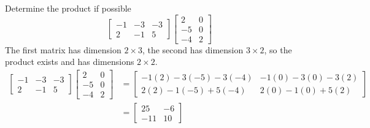 \documentclass[letterpaper,12pt]{article}
\begin{document}
\begin{example}
Determine the product if possible
\begin{equation*}
    \begin{bmatrix} -1 & -3 & -3 \\ 2 & -1 & 5 \end{bmatrix} \begin{bmatrix} 2 & 0 \\ -5 & 0 \\ -4 & 2 \end{bmatrix}
\end{equation*}
The first matrix has dimension $2 \times 3$, the second has dimension $3 \times 2$, so the product exists and has dimensions $2 \times 2$.
\begin{align*}
    \begin{bmatrix} -1 & -3 & -3 \\ 2 & -1 & 5 \end{bmatrix} \begin{bmatrix} 2 & 0 \\ -5 & 0 \\ -4 & 2 \end{bmatrix} & = \begin{bmatrix} -1(2) - 3(-5) - 3(-4) & -1(0) - 3(0) - 3(2) \\ 2(2) - 1(-5) + 5(-4) & 2(0) - 1(0) + 5(2) \end{bmatrix} \\
    & = \begin{bmatrix} 25 & -6 \\ -11 & 10 \end{bmatrix}
\end{align*}
\end{example}
\end{document}

